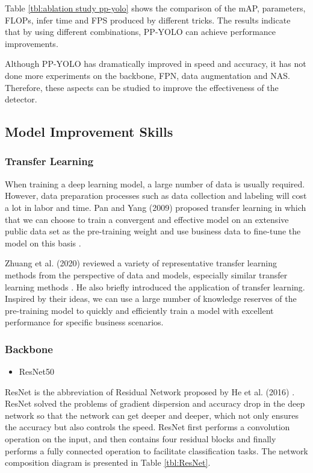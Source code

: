 \documentclass[sensors,article,submit,moreauthors,pdftex]{Definitions/mdpi}
\begin{document}
Table \ref{tbl:ablation study pp-yolo} shows the comparison of the mAP, parameters, FLOPs, infer time and FPS produced by different tricks. The results indicate that by using different combinations, PP-YOLO can achieve performance improvements.

Although PP-YOLO has dramatically improved in speed and accuracy, it has not done more experiments on the backbone, FPN, data augmentation and NAS. Therefore, these aspects can be studied to improve the effectiveness of the detector.



\subsection{Model Improvement Skills}
\subsubsection{Transfer Learning}

When training a deep learning model, a large number of data is usually required. However, data preparation processes such as data collection and labeling will cost a lot in labor and time.
Pan and Yang (2009) proposed transfer learning in which that we can choose to train a convergent and effective model on an extensive public data set as the pre-training weight and use business data to fine-tune the model on this basis \cite{pan2009survey}.

Zhuang et al. (2020) reviewed a variety of representative transfer learning methods from the perspective of data and models, especially similar transfer learning methods \cite{zhuang2020comprehensive}. He also briefly introduced the application of transfer learning.
Inspired by their ideas, we can use a large number of knowledge reserves of the pre-training model to quickly and efficiently train a model with excellent performance for specific business scenarios.


\subsubsection{Backbone}

\begin{itemize}
\item ResNet50
\end{itemize}

ResNet is the abbreviation of Residual Network proposed by He et al. (2016) \cite{he2016deep}. ResNet solved the problems of gradient dispersion and accuracy drop in the deep network so that the network can get deeper and deeper, which not only ensures the accuracy but also controls the speed. ResNet first performs a convolution operation on the input, and then contains four residual blocks and finally performs a fully connected operation to facilitate classification tasks. The network composition diagram is presented in Table \ref{tbl:ResNet}.
\end{document}
